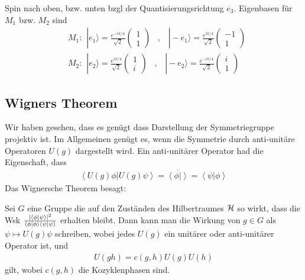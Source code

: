Spin nach oben, bzw. unten bzgl der Quantisierungsrichtung $e_3$. Eigenbasen für
$M_1$ bzw. $M_2$ sind
\begin{align*}
    &M_1 : \hspace{5pt} |e_1\rangle = \frac{e^{-i \pi /4}}{\sqrt{2}} \begin{pmatrix}
        1 \\ 1
    \end{pmatrix} \hspace{10pt} , \hspace{10pt}
    |-e_1 \rangle = \frac{e^{i \pi /4}}{\sqrt{2}} \begin{pmatrix}
        -1 \\ 1
    \end{pmatrix}
    \\
    &M_2 : \hspace{5pt} |e_2\rangle = \frac{e^{i \pi / 4}}{\sqrt{2}} \begin{pmatrix}
        1 \\ i
    \end{pmatrix} \hspace{10pt} , \hspace{10pt}
    |-e_2\rangle = \frac{e^{-i \pi /4}}{\sqrt{2}} \begin{pmatrix}
        i \\ 1
    \end{pmatrix}
\end{align*}

\subsection{Wigners Theorem}

Wir haben gesehen, dass es genügt dass Darstellung der Symmetriegruppe projektiv ist.
Im Allgemeinen genügt es, wenn die Symmetrie durch anti-unitäre Operatoren $U(g)$
dargestellt wird. Ein anti-unitärer Operator had die Eigenschaft, dass
\begin{align*}
    \left\langle U(g) \phi | U(g) \psi \right\rangle =
    \overline{\left\langle \phi | \right\rangle}
    = \left\langle \psi | \phi \right\rangle
\end{align*}
Das Wignersche Theorem besagt: 
\begin{theorem}
    Sei $G$ eine Gruppe die auf den Zuständen des
    Hilbertraumes $\mathcal{H}$ so wirkt, dass die Wsk
    $\frac{\left\vert \left\langle \phi | \psi \right\rangle \right\vert^2}{\left\langle \phi | \phi \right\rangle \left\langle \psi | \psi \right\rangle}$
    erhalten bleibt. Dann kann man die Wirkung von $g \in G$ als $\psi \mapsto U(g) \psi$
    schreiben, wobei jedes $U(g)$ ein unitärer oder anti-unitärer Operator ist, und
    \begin{align*}
        U(g h) = c(g,h) U(g) U(h)
    \end{align*}
    gilt, wobei $c(g,h)$ die Kozyklenphasen sind.
\end{theorem}

